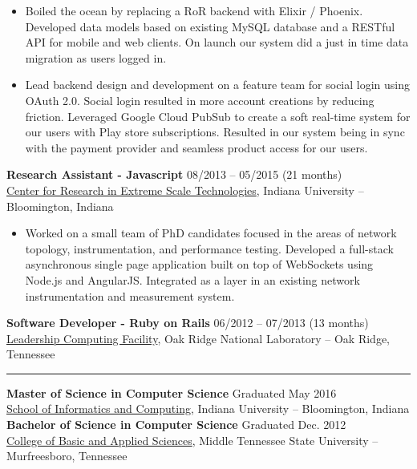 \documentclass[12pt,letterpaper]{article}
\begin{document}
\begin{itemize}

  \item Boiled the ocean by replacing a RoR backend with Elixir / Phoenix. Developed data models based on existing MySQL database and a RESTful API for mobile and web clients. On launch our system did a just in time data migration as users logged in.

  \item Lead backend design and development on a feature team for social login using OAuth 2.0. Social login resulted in more account creations by reducing friction. Leveraged Google Cloud PubSub to create a soft real-time system for our users with Play store subscriptions. Resulted in our system being in sync with the payment provider and seamless product access for our users.

\end{itemize}

\noindent\textbf{Research Assistant - Javascript}
\hfill{08/2013 -- 05/2015 (21 months)} \\
\href{https://pti.iu.edu/centers/crest.html}{Center for Research in Extreme Scale Technologies}, Indiana University -- Bloomington, Indiana

\begin{itemize}

  \item Worked on a small team of PhD candidates focused in the areas of network topology, instrumentation, and performance testing. Developed a full-stack asynchronous single page application built on top of WebSockets using Node.js and AngularJS. Integrated as a layer in an existing network instrumentation and measurement system.

\end{itemize}


\noindent\textbf{Software Developer - Ruby on Rails}
\hfill{06/2012 -- 07/2013 (13 months)} \\
\href{https://www.olcf.ornl.gov/}{Leadership Computing Facility}, Oak Ridge National Laboratory -- Oak Ridge, Tennessee

\noindent\rule{7.5in}{0.4pt}

\noindent\textbf{Master of Science in Computer Science}
\hfill{Graduated May 2016} \\
\href{https://luddy.indiana.edu/}{School of Informatics and Computing}, Indiana University -- Bloomington, Indiana \\

\noindent\textbf{Bachelor of Science in Computer Science}
\hfill{Graduated Dec. 2012} \\
\href{https://www.mtsu.edu/cbas/}{College of Basic and Applied Sciences}, Middle Tennessee State University -- Murfreesboro, Tennessee
\end{document}
